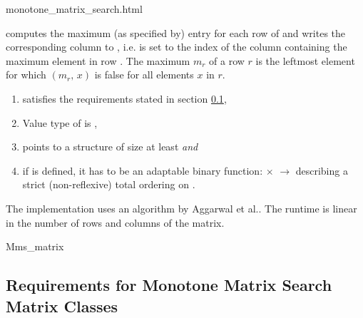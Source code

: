 \begin{ccAdvanced}
\begin{ccHtmlClassFile}{monotone_matrix_search.html}

    \def\ccLongParamLayout{\ccTrue} 

    
    computes the maximum (as specified by) entry
    for each row of  and writes the corresponding column to
    , i.e.  is set to the index of the column
    containing the maximum element in row . The maximum $m_r$ of
    a row $r$ is the leftmost element for which
    $(m_r,\,x)$ is false for all elements $x$ in
    $r$.

    \cgalColumnLayout
    \begin{enumerate}
    \item {} satisfies the requirements stated in section
      \ref{req_DynamicMatrix},
    \item Value type of  is ,
    \item {} points to a structure of size at least
       \textit{and}
    \item if  is defined, it has to be an
      adaptable binary function:  $\times$
       $\rightarrow$  describing a strict
      (non-reflexive) total ordering on .
    \end{enumerate}
    
    \ccImplementation The implementation uses an algorithm by Aggarwal
    et al.\cite{akmsw-gamsa-87}. The runtime is linear in the number of
    rows and columns of the matrix.

  \end{ccHtmlClassFile}

  \ccHtmlNoClassToc\ccHtmlNoClassIndex\begin{ccClass}{Mms_matrix}
    \ccTagFullDeclarations
    \subsection{Requirements for Monotone Matrix Search Matrix Classes}
    \label{req_DynamicMatrix}
    

\end{ccClass}
\end{ccAdvanced}

